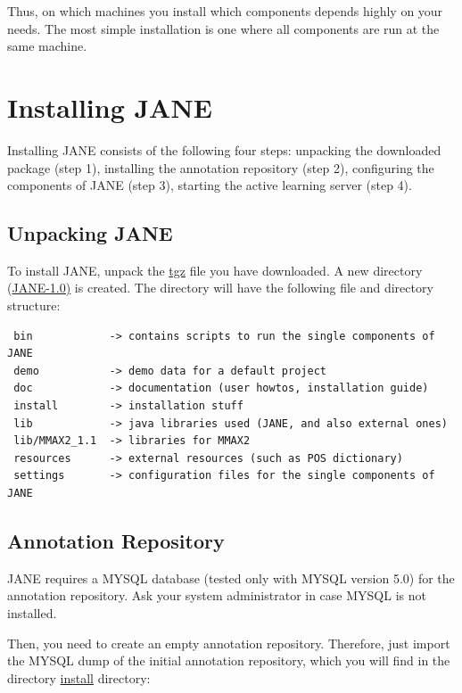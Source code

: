 \documentclass[DIV12,english,11pt,halfparskip]{scrartcl}
\begin{document}
Thus, on which machines you install which components depends highly on
your needs. The most simple installation is one where all components
are run at the same machine.




\section{Installing JANE}
\label{sec:installation}

Installing JANE consists of the following four steps: unpacking the
downloaded package (step 1), installing the annotation repository
(step 2), configuring the components of JANE (step 3), starting the
active learning server (step 4).




\subsection{Unpacking JANE}

To install JANE, unpack the \url{tgz} file you have
downloaded.  A new directory (\url{JANE-1.0)} is created. The
directory will have the following file and directory structure:

\begin{verbatim}
 bin            -> contains scripts to run the single components of JANE
 demo           -> demo data for a default project
 doc            -> documentation (user howtos, installation guide)
 install        -> installation stuff 
 lib            -> java libraries used (JANE, and also external ones)
 lib/MMAX2_1.1  -> libraries for MMAX2
 resources      -> external resources (such as POS dictionary)
 settings       -> configuration files for the single components of JANE
\end{verbatim}


\subsection{Annotation Repository}
\label{ss:install_annorep}

\textsc{JANE} requires a MYSQL database (tested only with MYSQL
version 5.0) for the annotation repository.  Ask your system
administrator in case MYSQL is not installed.

Then, you need to create an empty annotation repository. Therefore,
just import the MYSQL dump of the initial annotation repository, which
you will find in the directory \url{install} directory:
\end{document}
